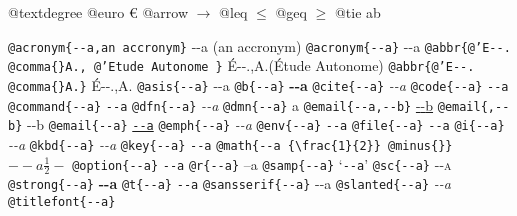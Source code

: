 \documentclass{book}
\newcommand\GNUTexinfocommandstylecodetextcite[1]{{\normalfont{}\textsl{#1}}}%
\newenvironment{GNUTexinfopreformatted}{%
  \par\begingroup\obeylines\obeyspaces\frenchspacing}{\endgroup}
\begin{document}
\begin{GNUTexinfopreformatted}
@textdegree \textdegree{}
@euro \euro{}
@arrow $\rightarrow{}$
@leq $\leq{}$
@geq $\geq{}$
@tie a\hbox{}b

\texttt{@acronym\{{-}{-}a,an accronym\}} {-}{-}a (an accronym)
\texttt{@acronym\{{-}{-}a\}} {-}{-}a
\texttt{@abbr\{@'E{-}{-}. @comma\{\}A., @'Etude Autonome \}} \'{E}{-}{-}.\@ ,A.\@ (\'{E}tude Autonome)
\texttt{@abbr\{@'E{-}{-}. @comma\{\}A.\}} \'{E}{-}{-}.\@ ,A.\@
\texttt{@asis\{{-}{-}a\}} {-}{-}a
\texttt{@b\{{-}{-}a\}} \textbf{{-}{-}a}
\texttt{@cite\{{-}{-}a\}} \GNUTexinfocommandstylecodetextcite{{-}{-}a}
\texttt{@code\{{-}{-}a\}} \texttt{{-}{-}a}
\texttt{@command\{{-}{-}a\}} \texttt{{-}{-}a}
\texttt{@dfn\{{-}{-}a\}} \textsl{{-}{-}a}
\texttt{@dmn\{{-}{-}a\}} \thinspace {-}{-}a
\texttt{@email\{{-}{-}a,{-}{-}b\}} \href{mailto:--a}{{-}{-}b}
\texttt{@email\{,{-}{-}b\}} {-}{-}b
\texttt{@email\{{-}{-}a\}} \href{mailto:--a}{\nolinkurl{--a}}
\texttt{@emph\{{-}{-}a\}} \emph{{-}{-}a}
\texttt{@env\{{-}{-}a\}} \texttt{{-}{-}a}
\texttt{@file\{{-}{-}a\}} \texttt{{-}{-}a}
\texttt{@i\{{-}{-}a\}} \textit{{-}{-}a}
\texttt{@kbd\{{-}{-}a\}} {\ttfamily\textsl{{-}{-}a}}
\texttt{@key\{{-}{-}a\}} \texttt{{-}{-}a}
\texttt{@math\{{-}{-}a \{\textbackslash{}frac\{1\}\{2\}\} @minus\{\}\}} $--a {\frac{1}{2}} -$
\texttt{@option\{{-}{-}a\}} \texttt{{-}{-}a}
\texttt{@r\{{-}{-}a\}} \textnormal{--a}
\texttt{@samp\{{-}{-}a\}} `\texttt{{-}{-}a}'
\texttt{@sc\{{-}{-}a\}} \textsc{{-}{-}a}
\texttt{@strong\{{-}{-}a\}} \textbf{{-}{-}a}
\texttt{@t\{{-}{-}a\}} \texttt{{-}{-}a}
\texttt{@sansserif\{{-}{-}a\}} \textsf{{-}{-}a}
\texttt{@slanted\{{-}{-}a\}} \textsl{{-}{-}a}
\texttt{@titlefont\{{-}{-}a\}} \end{GNUTexinfopreformatted}
\end{document}
